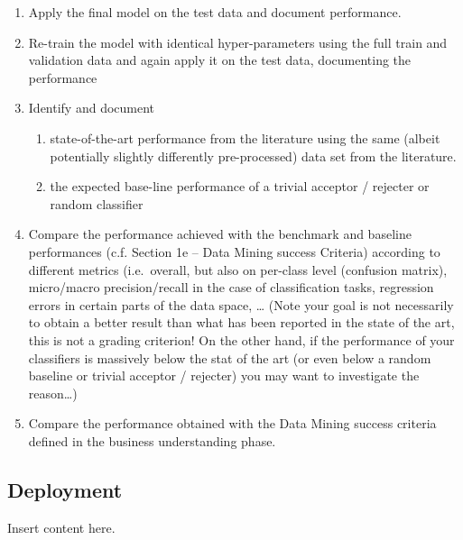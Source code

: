 \documentclass[sigchi]{acmart}
\def\tightlist{}
\begin{document}
\begin{enumerate}
\def\labelenumi{\alph{enumi}.}
\tightlist
\item
  Apply the final model on the test data and document performance.
\item
  Re-train the model with identical hyper-parameters using the full train and validation data and again apply it on the test data, documenting the performance
\item
  Identify and document

  \begin{enumerate}
  \def\labelenumii{\roman{enumii}.}
  \tightlist
  \item
    state-of-the-art performance from the literature using the same (albeit potentially slightly differently pre-processed) data set from the literature.
  \item
    the expected base-line performance of a trivial acceptor / rejecter or random classifier
  \end{enumerate}
\item
  Compare the performance achieved with the benchmark and baseline performances (c.f. Section 1e -- Data Mining success Criteria) according to different metrics (i.e.~overall, but also on per-class level (confusion matrix), micro/macro precision/recall in the case of classification tasks, regression errors in certain parts of the data space, \ldots{} (Note your goal is not necessarily to obtain a better result than what has been reported in the state of the art, this is not a grading criterion! On the other hand, if the performance of your classifiers is massively below the stat of the art (or even below a random baseline or trivial acceptor / rejecter) you may want to investigate the reason\ldots)
\item
  Compare the performance obtained with the Data Mining success criteria defined in the business understanding phase.
\end{enumerate}

\hypertarget{deployment}{%
\subsection{Deployment}\label{deployment}}

Insert content here.
\end{document}
